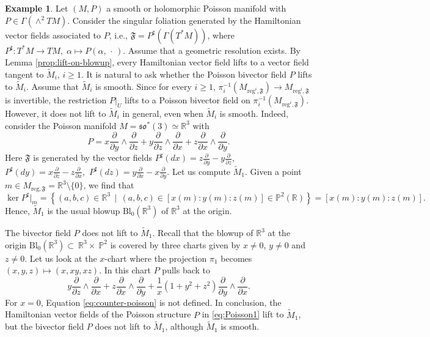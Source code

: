 \documentclass[10pt]{article}
\theoremstyle{plain}
\theoremstyle{definition}
\newtheorem{example}[lemma]{Example}
\theoremstyle{remark}
\begin{document}
\begin{example}
   Let $(M,P)$ a smooth or holomorphic Poisson manifold with $P\in \Gamma(\wedge^2TM)$. Consider the singular foliation  generated by the Hamiltonian vector fields associated to $P$, i.e., $\mathfrak F=P^{\sharp}(\Gamma(T^*M))$, where $P^\sharp\colon T^*M\longrightarrow TM,\; \alpha\mapsto P(\alpha, \,\cdot\,)$. Assume that a geometric resolution exists.  By Lemma \ref{prop:lift-on-blowup}, every Hamiltonian vector field lifts to a vector field tangent to $\widetilde M_i$, $i\geq 1$. It is natural to ask whether the Poisson bivector field $P$ lifts to $\widetilde M_i$. Assume that $\widetilde M_i$ is smooth. Since for every $i\geq 1$,  $\pi_i^{-1}(M_{\mathrm{reg}^i, \mathfrak F})\longrightarrow M_{\mathrm{reg}^i,\mathfrak F}$ is invertible, the restriction $P|_U$ lifts to a Poisson bivector field on $\pi_i^{-1}(M_{\mathrm{reg}^i, \mathfrak F})$. However, it  does not lift to $\widetilde M_i$ in general, even when $\widetilde M_i$ is smooth. Indeed, consider the Poisson manifold $M=\mathfrak{so}^*(3)\simeq \mathbb R^3$ with \begin{equation}\label{eq:Poisson1}
       P=x \frac{\partial}{\partial y}\wedge \frac{\partial}{\partial z}+ y\frac{\partial}{\partial z}\wedge \frac{\partial}{\partial x}+z\frac{\partial}{\partial x}\wedge \frac{\partial}{\partial y}.
   \end{equation} Here $\mathfrak F$ is generated by the vector fields $P^\sharp(dx)= z\frac{\partial}{\partial y}-y\frac{\partial}{\partial z}$,\, $P^\sharp(dy)= x\frac{\partial}{\partial z}-z\frac{\partial}{\partial x}$,\, $P^\sharp(dz)= y\frac{\partial}{\partial x}-x\frac{\partial}{\partial y}$. Let us compute $\widetilde M_1$. Given a point $m\in M_{\mathrm {reg}, \mathfrak F}=\mathbb R^3\setminus \{0\}$, we find that
   $$\ker P^\sharp|_m=\left\{(a,b,c)\in \mathbb R^3 \,\mid\,(a,b,c)\in [x(m):y(m):z(m)]\in \mathbb P^2(\mathbb R)\right\}=[x(m):y(m):z(m)]
   .$$ Hence, $\widetilde M_1$ is the usual blowup $\mathrm{Bl}_0(\mathbb R^3)$ of $\mathbb R^3$ at the origin.

   The bivector field $P$ does not lift to $\widetilde M_1$. Recall that the blowup of $\mathbb R^3$ at the origin   $\mathrm{Bl}_0(\mathbb R^3)\subset~ \mathbb R^3\times~\mathbb P^2$ is covered by three charts given by $x\neq 0$, $y\neq 0$ and $z\neq 0$.  Let us look at the $x$-chart where the projection $\pi_1$ becomes $(x,y,z)\mapsto(x,xy, xz)$. In this chart  $P$ pulls back to
   \begin{equation}\label{eq:counter-poisson}
       y\frac{\partial}{\partial z}\wedge \frac{\partial}{\partial x}+z\frac{\partial}{\partial x}\wedge \frac{\partial}{\partial y}+\frac{1}{x}(1+y^2+z^2)\frac{\partial}{\partial y}\wedge \frac{\partial}{\partial x}.
   \end{equation} For $x= 0$, Equation \eqref{eq:counter-poisson} is not defined. In conclusion, the Hamiltonian vector fields of the Poisson structure $P$ in \eqref{eq:Poisson1} lift to $\widetilde M_1$, but the bivector field $P$ does not lift to $\widetilde M_1$,  although $\widetilde M_1$ is smooth.
   \end{example}
\end{document}
